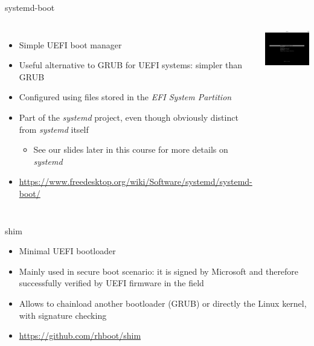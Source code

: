 \begin{frame}{systemd-boot}
  \begin{columns}
    \begin{itemize}
    \item Simple UEFI boot manager
    \item Useful alternative to GRUB for UEFI systems: simpler than GRUB
    \item Configured using files stored in the {\em EFI System
        Partition}
    \item Part of the {\em systemd} project, even though obviously
      distinct from {\em systemd} itself
      \begin{itemize}
      \item See our slides later in this course for more details on {\em
          systemd}
      \end{itemize}
    \item \url{https://www.freedesktop.org/wiki/Software/systemd/systemd-boot/}
    \end{itemize}
    \includegraphics[width=\textwidth]{slides/sysdev-bootloaders-sequence/systemd-boot.png}
  \end{columns}
\end{frame}

\begin{frame}{shim}
  \begin{itemize}
  \item Minimal UEFI bootloader
  \item Mainly used in secure boot scenario: it is signed by Microsoft
    and therefore successfully verified by UEFI firmware in the field
  \item Allows to chainload another bootloader (GRUB) or directly
    the Linux kernel, with signature checking
  \item \url{https://github.com/rhboot/shim}
  \end{itemize}
\end{frame}

